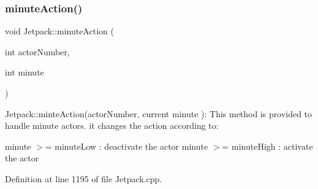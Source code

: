 \mbox{\label{class_jetpack_a97da41141c7b53ddee61143519c8d17d}} 
\subsubsection{\texorpdfstring{minute\+Action()}{minuteAction()}}
{\footnotesize\ttfamily void Jetpack\+::minute\+Action (\begin{DoxyParamCaption}\item[{int}]{actor\+Number,  }\item[{int}]{minute }\end{DoxyParamCaption})}

Jetpack\+::minte\+Action(actor\+Number, current minute )\+: This method is provided to handle minute actors. it changes the action according to\+:

minute $>$= minute\+Low \+: deactivate the actor minute $>$= minute\+High \+: activate the actor 

Definition at line 1195 of file Jetpack.\+cpp.


